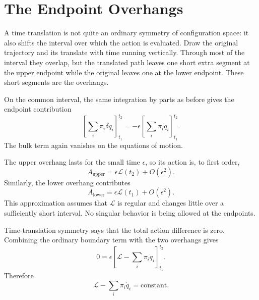 \section{The Endpoint Overhangs}

A time translation is not quite an ordinary symmetry of configuration space:
it also shifts the interval over which the action is evaluated. Draw the
original trajectory and its translate with time running vertically. Through
most of the interval they overlap, but the translated path leaves one short
extra segment at the upper endpoint while the original leaves one at the
lower endpoint. These short segments are the overhangs.

On the common interval, the same integration by parts as before gives the
endpoint contribution
\begin{equation}
 \left[
 \sum_i\pi_i\delta q_i
 \right]_{t_1}^{t_2}
 =-\epsilon
 \left[
 \sum_i\pi_i\dot q_i
 \right]_{t_1}^{t_2}.
 \label{eq:l04-time-boundary-term}
\end{equation}
The bulk term again vanishes on the equations of motion.

The upper overhang lasts for the small time \(\epsilon\), so its action is,
to first order,
\begin{equation}
 A_{\mathrm{upper}}=\epsilon\mathcal L(t_2)+O(\epsilon^2).
\end{equation}
Similarly, the lower overhang contributes
\begin{equation}
 A_{\mathrm{lower}}=\epsilon\mathcal L(t_1)+O(\epsilon^2).
\end{equation}
This approximation assumes that \(\mathcal L\) is regular and changes little
over a sufficiently short interval. No singular behavior is being allowed at
the endpoints.

Time-translation symmetry says that the total action difference is zero.
Combining the ordinary boundary term with the two overhangs gives
\begin{equation}
 0=\epsilon
 \left[
 \mathcal L-\sum_i\pi_i\dot q_i
 \right]_{t_1}^{t_2}.
 \label{eq:l04-time-noether-endpoints}
\end{equation}
Therefore
\begin{equation}
 \mathcal L-\sum_i\pi_i\dot q_i
 =\text{constant}.
\end{equation}

\begin{classroomqa}
\end{classroomqa}


